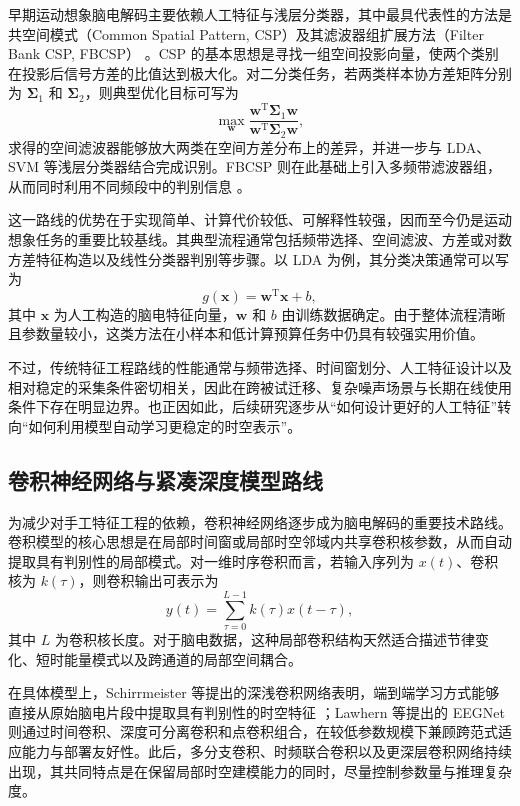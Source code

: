 早期运动想象脑电解码主要依赖人工特征与浅层分类器，其中最具代表性的方法是共空间模式（Common Spatial Pattern, CSP）及其滤波器组扩展方法（Filter Bank CSP, FBCSP） \cite{ang2012filter, lotte2018review}。CSP 的基本思想是寻找一组空间投影向量，使两个类别在投影后信号方差的比值达到极大化。对二分类任务，若两类样本协方差矩阵分别为 $\mathbf{\Sigma}_1$ 和 $\mathbf{\Sigma}_2$，则典型优化目标可写为
\begin{equation}
\max_{\mathbf{w}} \frac{\mathbf{w}^{\mathrm{T}}\mathbf{\Sigma}_1 \mathbf{w}}{\mathbf{w}^{\mathrm{T}}\mathbf{\Sigma}_2 \mathbf{w}},
\end{equation}
求得的空间滤波器能够放大两类在空间方差分布上的差异，并进一步与 LDA、SVM 等浅层分类器结合完成识别。FBCSP 则在此基础上引入多频带滤波器组，从而同时利用不同频段中的判别信息 \cite{ang2012filter}。

这一路线的优势在于实现简单、计算代价较低、可解释性较强，因而至今仍是运动想象任务的重要比较基线。其典型流程通常包括频带选择、空间滤波、方差或对数方差特征构造以及线性分类器判别等步骤。以 LDA 为例，其分类决策通常可以写为
\begin{equation}
g(\mathbf{x})=\mathbf{w}^{\mathrm{T}}\mathbf{x}+b,
\end{equation}
其中 $\mathbf{x}$ 为人工构造的脑电特征向量，$\mathbf{w}$ 和 $b$ 由训练数据确定。由于整体流程清晰且参数量较小，这类方法在小样本和低计算预算任务中仍具有较强实用价值。

不过，传统特征工程路线的性能通常与频带选择、时间窗划分、人工特征设计以及相对稳定的采集条件密切相关，因此在跨被试迁移、复杂噪声场景与长期在线使用条件下存在明显边界。也正因如此，后续研究逐步从“如何设计更好的人工特征”转向“如何利用模型自动学习更稳定的时空表示”。

\subsection{卷积神经网络与紧凑深度模型路线}

为减少对手工特征工程的依赖，卷积神经网络逐步成为脑电解码的重要技术路线。卷积模型的核心思想是在局部时间窗或局部时空邻域内共享卷积核参数，从而自动提取具有判别性的局部模式。对一维时序卷积而言，若输入序列为 $x(t)$、卷积核为 $k(\tau)$，则卷积输出可表示为
\begin{equation}
y(t)=\sum_{\tau=0}^{L-1} k(\tau)x(t-\tau),
\end{equation}
其中 $L$ 为卷积核长度。对于脑电数据，这种局部卷积结构天然适合描述节律变化、短时能量模式以及跨通道的局部空间耦合。

在具体模型上，Schirrmeister 等提出的深浅卷积网络表明，端到端学习方式能够直接从原始脑电片段中提取具有判别性的时空特征 \cite{schirrmeister2017deep}；Lawhern 等提出的 EEGNet 则通过时间卷积、深度可分离卷积和点卷积组合，在较低参数规模下兼顾跨范式适应能力与部署友好性\cite{lawhern2018eegnet}。此后，多分支卷积、时频联合卷积以及更深层卷积网络持续出现，其共同特点是在保留局部时空建模能力的同时，尽量控制参数量与推理复杂度。

